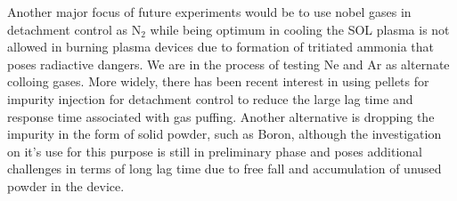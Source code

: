 Another major focus of future experiments would be to use nobel gases in detachment control as N$_2$ while being optimum in cooling the SOL plasma is not allowed in burning plasma devices due to formation of tritiated ammonia that poses radiactive dangers. We are in the process of testing Ne and Ar as alternate colloing gases. More widely, there has been recent interest in using pellets for impurity injection for detachment control to reduce the large lag time and response time associated with gas puffing. Another alternative is dropping the impurity in the form of solid powder, such as Boron, although the investigation on it's use for this purpose is still in preliminary phase and poses additional challenges in terms of long lag time due to free fall and accumulation of unused powder in the device.